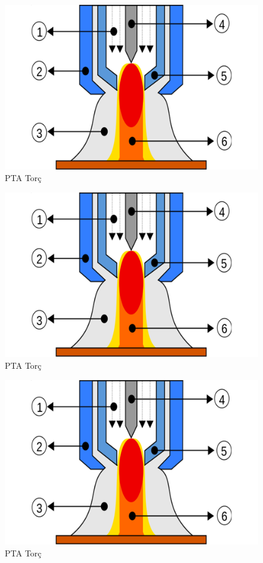 \begin{figure}[htp]
\includegraphics[width=\textwidth]{gorseller/ptaTorc}
\caption{PTA Torç}\label{fig:PtaTorc7}
\end{figure}\begin{figure}[htp]
\includegraphics[width=\textwidth]{gorseller/ptaTorc}
\caption{PTA Torç}\label{fig:PtaTorc8}
\end{figure}
\begin{figure}[htp]
\includegraphics[width=\textwidth]{gorseller/ptaTorc}
\caption{PTA Torç}\label{fig:PtaTorc9}
\end{figure}

